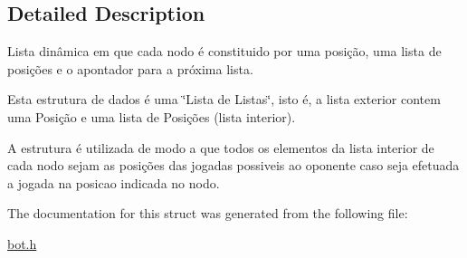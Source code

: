 \subsection{Detailed Description}
Lista dinâmica em que cada nodo é constituido por uma posição, uma lista de posições e o apontador para a próxima lista. 

Esta estrutura de dados é uma \char`\"{}\+Lista de Listas\char`\"{}, isto é, a lista exterior contem uma Posição e uma lista de Posições (lista interior).

A estrutura é utilizada de modo a que todos os elementos da lista interior de cada nodo sejam as posições das jogadas possiveis ao oponente caso seja efetuada a jogada na posicao indicada no nodo. 

The documentation for this struct was generated from the following file\+:\begin{DoxyCompactItemize}
\item 
\hyperlink{bot_8h}{bot.\+h}\end{DoxyCompactItemize}
